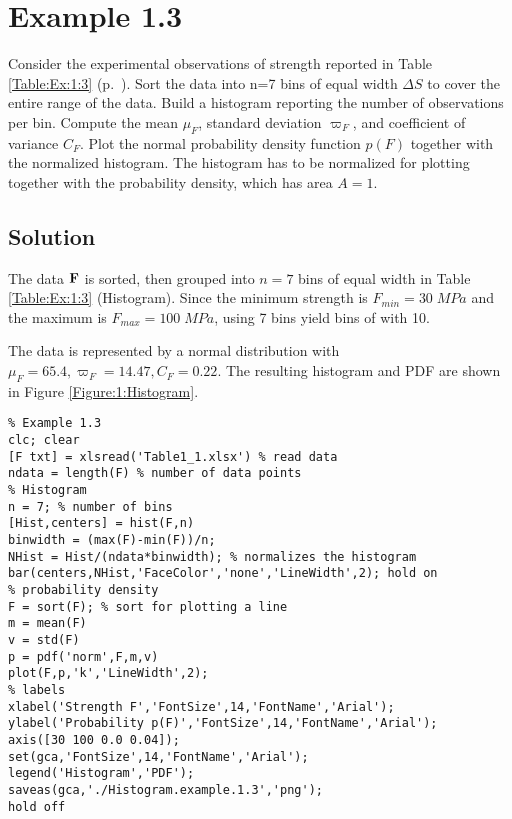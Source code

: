\documentclass[12pt,letterpaper]{article}
\begin{document}
\verbatimfont{\small}

\section*{Example 1.3}
Consider the experimental observations of strength reported in Table \ref{Table:Ex:1:3} (p.~\pageref{Table:Ex:1:3}). Sort the
data into n=7 bins of equal width $\Delta S$ to cover the entire range of the data.  Build a histogram reporting  the number of observations per bin. Compute the mean $\mu_F$, standard deviation $\varpi_F$, and coefficient of variance $C_F$. Plot the normal probability density function $p(F)$ together with the normalized histogram. The histogram has to be normalized for plotting together with the probability density, which has area $A=1$. 

\subsection*{Solution}
The data $\bf F$ is sorted, then grouped into $n=7$ bins of equal width in Table \ref{Table:Ex:1:3} (Histogram).  Since the minimum strength is $F_{min}=30\;MPa$ and the maximum is $F_{max}=100\;MPa$, using 7 bins yield bins of with 10. 

The data is represented by a normal distribution with $\mu_F=65.4, \varpi_F=14.47, C_F=0.22$. The resulting histogram and PDF are shown in Figure \ref{Figure:1:Histogram}. 


\begin{verbatim}
% Example 1.3
clc; clear
[F txt] = xlsread('Table1_1.xlsx') % read data
ndata = length(F) % number of data points
% Histogram
n = 7; % number of bins
[Hist,centers] = hist(F,n)
binwidth = (max(F)-min(F))/n;
NHist = Hist/(ndata*binwidth); % normalizes the histogram 
bar(centers,NHist,'FaceColor','none','LineWidth',2); hold on
% probability density
F = sort(F); % sort for plotting a line
m = mean(F)
v = std(F)
p = pdf('norm',F,m,v)
plot(F,p,'k','LineWidth',2);
% labels
xlabel('Strength F','FontSize',14,'FontName','Arial'); 
ylabel('Probability p(F)','FontSize',14,'FontName','Arial');
axis([30 100 0.0 0.04]);
set(gca,'FontSize',14,'FontName','Arial'); 
legend('Histogram','PDF');
saveas(gca,'./Histogram.example.1.3','png');
hold off
\end{verbatim}
\end{document}
